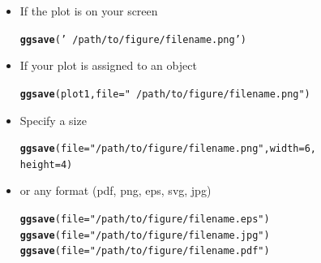 \documentclass{beamer}\usepackage[]{graphicx}\usepackage[]{color}
\makeatletter
\newcommand{\hlnum}[1]{\textcolor[rgb]{0.686,0.059,0.569}{#1}}%
\newcommand{\hlstr}[1]{\textcolor[rgb]{0.192,0.494,0.8}{#1}}%
\newcommand{\hlstd}[1]{\textcolor[rgb]{0.345,0.345,0.345}{#1}}%
\newcommand{\hlkwc}[1]{\textcolor[rgb]{0.333,0.667,0.333}{#1}}%
\newcommand{\hlkwd}[1]{\textcolor[rgb]{0.737,0.353,0.396}{\textbf{#1}}}%
\newenvironment{kframe}{%
 \def\at@end@of@kframe{}%
 \ifinner\ifhmode%
  \def\at@end@of@kframe{\end{minipage}}%
  \begin{minipage}{\columnwidth}%
 \fi\fi%
 \def\FrameCommand##1{\hskip\@totalleftmargin \hskip-\fboxsep
 \colorbox{shadecolor}{##1}\hskip-\fboxsep
     \hskip-\linewidth \hskip-\@totalleftmargin \hskip\columnwidth}%
 \MakeFramed {\advance\hsize-\width
   \@totalleftmargin\z@ \linewidth\hsize
   \@setminipage}}%
 {\par\unskip\endMakeFramed%
 \at@end@of@kframe}
\newenvironment{knitrout}{}{} %
\makeatother
\begin{document}
\begin{frame}[fragile]
\begin{itemize}
\item If the plot is on your screen
\begin{knitrout}\footnotesize
{}\color{fgcolor}\begin{kframe}
\begin{alltt}
\hlkwd{ggsave}\hlstd{(}\hlstr{'~/path/to/figure/filename.png'}\hlstd{)}
\end{alltt}
\end{kframe}
\end{knitrout}
\item If your plot is assigned to an object
\begin{knitrout}\footnotesize
{}\color{fgcolor}\begin{kframe}
\begin{alltt}
\hlkwd{ggsave}\hlstd{(plot1,} \hlkwc{file} \hlstd{=} \hlstr{"~/path/to/figure/filename.png"}\hlstd{)}
\end{alltt}
\end{kframe}
\end{knitrout}

\item Specify a size
\begin{knitrout}\footnotesize
{}\color{fgcolor}\begin{kframe}
\begin{alltt}
\hlkwd{ggsave}\hlstd{(}\hlkwc{file} \hlstd{=} \hlstr{"/path/to/figure/filename.png"}\hlstd{,} \hlkwc{width} \hlstd{=} \hlnum{6}\hlstd{,}
\hlkwc{height} \hlstd{=}\hlnum{4}\hlstd{)}
\end{alltt}
\end{kframe}
\end{knitrout}
\item or any format (pdf, png, eps, svg, jpg)
\begin{knitrout}\footnotesize
{}\color{fgcolor}\begin{kframe}
\begin{alltt}
\hlkwd{ggsave}\hlstd{(}\hlkwc{file} \hlstd{=} \hlstr{"/path/to/figure/filename.eps"}\hlstd{)}
\hlkwd{ggsave}\hlstd{(}\hlkwc{file} \hlstd{=} \hlstr{"/path/to/figure/filename.jpg"}\hlstd{)}
\hlkwd{ggsave}\hlstd{(}\hlkwc{file} \hlstd{=} \hlstr{"/path/to/figure/filename.pdf"}\hlstd{)}
\end{alltt}
\end{kframe}
\end{knitrout}
\end{itemize}
\end{frame}
\end{document}
